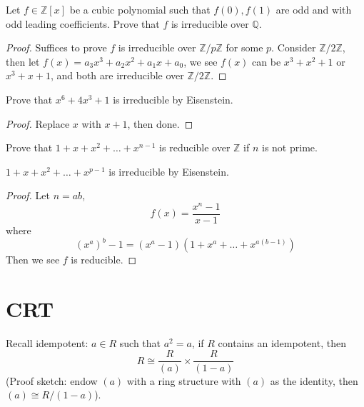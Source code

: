\documentclass[openany]{book}
\newcommand{\Z}{\mathbb{Z}}
\newcommand{\Q}{\mathbb{Q}}
\begin{document}
\begin{prob}[5.18]
    Let $f\in\Z[x]$ be a cubic polynomial such that $f(0), f(1)$ are odd and with odd leading coefficients. Prove that $f$ is irreducible over $\Q$.
\end{prob}
\begin{proof}
    Suffices to prove $f$ is irreducible over $\Z/p\Z$ for some $p$. Consider $\Z/2\Z$, then let $f(x)=a_3x^3+a_2x^2+a_1x+a_0$, we see $f(x)$ can be $x^3+x^2+1$ or $x^3+x+1$, and both are irreducible over $\Z/2\Z$. 
\end{proof}

\begin{prob}[5.20]
    Prove that $x^6+4x^3+1$ is irreducible by Eisenstein.
\end{prob}
\begin{proof}
    Replace $x$ with $x+1$, then done.
\end{proof}

\begin{prob}[5.21]
    Prove that $1+x+x^2+\dots +x^{n-1}$ is reducible over $\Z$ if $n$ is not prime.

    \begin{warn}
        $1+x+x^2+\dots+x^{p-1}$ is irreducible by Eisenstein.
    \end{warn}
\end{prob}
\begin{proof}
    Let $n=ab$, 
    \begin{equation*}
        f(x)=\frac{x^n-1}{x-1}
    \end{equation*}
    where 
    \begin{equation*}
        (x^a)^b-1=(x^a-1)(1+x^a+\dots+x^{a(b-1)})
    \end{equation*}
    Then we see $f$ is reducible.
\end{proof}










\section{CRT}
\begin{prop}[6.2]
    Recall idempotent: $a\in R$ such that $a^2=a$, if $R$ contains an idempotent, then 
    \begin{equation*}
        R\cong\frac{R}{(a)}\times\frac{R}{(1-a)}
    \end{equation*}
    (Proof sketch: endow $(a)$ with a ring structure with $(a)$ as the identity, then $(a)\cong R/(1-a)$).
\end{prop}
\end{document}
